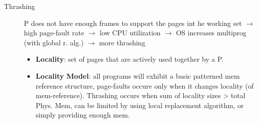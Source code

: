 \begin{description}
    \item[Thrashing] P does not have enough frames to support the pages int he working set $\rightarrow$ high page-fault rate $\rightarrow$ low CPU utilization $\rightarrow$ OS increases multiprog (with global r. alg.) $\rightarrow$ more thrashing
    \begin{itemize}
        \item \textbf{Locality}: set of pages that are actively used together by a P.
        \item \textbf{Locality Model}: all programs will exhibit a basic patterned mem reference structure, page-faults occure only when it changes locality (of mem-reference). Thrashing occurs when sum of locality sizes > total Phys. Mem, can be limited by using local replacement algorithm, or simply providing enough mem.
    \end{itemize} %
\end{description}
